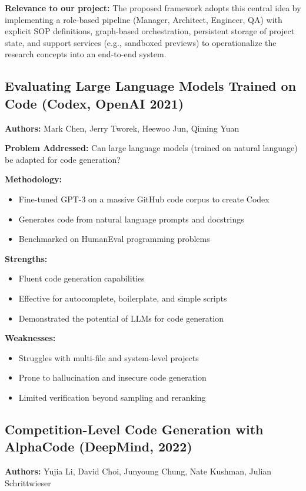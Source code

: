 \textbf{Relevance to our project:} The proposed framework adopts this central idea by implementing a role-based pipeline (Manager, Architect, Engineer, QA) with explicit SOP definitions, graph-based orchestration, persistent storage of project state, and support services (e.g., sandboxed previews) to operationalize the research concepts into an end-to-end system.

\subsection{Evaluating Large Language Models Trained on Code (Codex, OpenAI 2021)}
\textbf{Authors:} Mark Chen, Jerry Tworek, Heewoo Jun, Qiming Yuan

\textbf{Problem Addressed:} Can large language models (trained on natural language) be adapted for code generation?

\textbf{Methodology:}
\begin{itemize}
    \item Fine-tuned GPT-3 on a massive GitHub code corpus to create Codex
    \item Generates code from natural language prompts and docstrings
    \item Benchmarked on HumanEval programming problems
\end{itemize}

\textbf{Strengths:}
\begin{itemize}
    \item Fluent code generation capabilities
    \item Effective for autocomplete, boilerplate, and simple scripts
    \item Demonstrated the potential of LLMs for code generation
\end{itemize}

\textbf{Weaknesses:}
\begin{itemize}
    \item Struggles with multi-file and system-level projects
    \item Prone to hallucination and insecure code generation
    \item Limited verification beyond sampling and reranking
\end{itemize}

\subsection{Competition-Level Code Generation with AlphaCode (DeepMind, 2022)}
\textbf{Authors:} Yujia Li, David Choi, Junyoung Chung, Nate Kushman, Julian Schrittwieser


